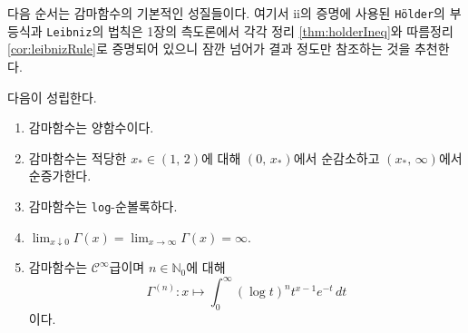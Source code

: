 다음 순서는 감마함수의 기본적인 성질들이다. 여기서 ii의 증명에 사용된 \texttt{H\"older}의 부등식과 \texttt{Leibniz}의 법칙은 1장의 측도론에서 각각 정리 \ref{thm:holderIneq}와 따름정리 \ref{cor:leibnizRule}로 증명되어 있으니 잠깐 넘어가 결과 정도만 참조하는 것을 추천한다.

\begin{theorem}\label{thm:gammaProp}
    다음이 성립한다.
    \begin{enumerate}
        \item 감마함수는 양함수이다.
        \item 감마함수는 적당한 $x_*\in(1,\,2)$에 대해 $(0,\,x_*)$에서 순감소하고 $(x_*,\,\infty)$에서 순증가한다.
        \item 감마함수는 \texttt{log}-순볼록하다.
        \item $\lim_{x\downarrow 0}\Gamma(x)=\lim_{x\to\infty}\Gamma(x)=\infty$.
        \item 감마함수는 $\mathcal{C}^\infty$급이며 $n\in\mathbb{N}_0$에 대해
        \begin{equation*}
            \Gamma^{(n)}:x\mapsto\int_0^\infty(\log t)^nt^{x-1}e^{-t}\,dt
        \end{equation*}
        이다.
    \end{enumerate}
\end{theorem}

